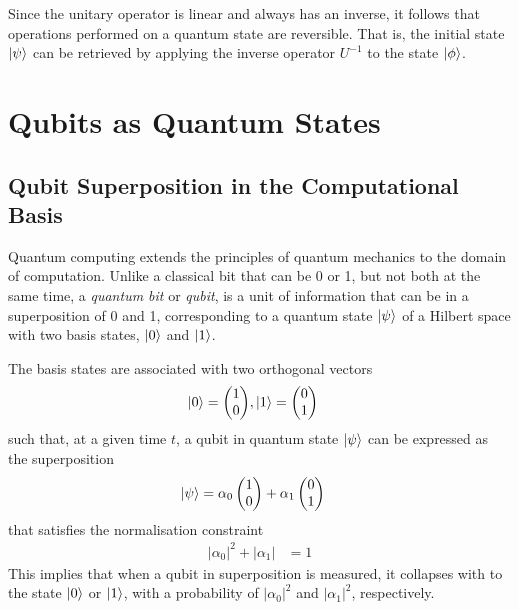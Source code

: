 Since the unitary operator is linear and always has an inverse, it follows that operations performed on a quantum state are reversible. That is, the initial state $\ket{\psi}$ can be retrieved by applying the inverse operator $U^{-1}$ to the state $\ket{\phi}$.  

\section{Qubits as Quantum States \label{sec:q-states-qubits}}

\subsection{Qubit Superposition in the Computational Basis}

Quantum computing extends the principles of quantum mechanics to the domain of computation. Unlike a classical bit that can be 0 or 1, but not both at the same time, a \textit{quantum bit} or \textit{qubit}, is a unit of information that can be in a superposition of 0 and 1, corresponding to a quantum state $\ket{\psi}$ of a Hilbert space with two basis states, $\ket{0}$ and $\ket{1}$. 

The basis states are associated with two orthogonal vectors
\begin{align}
	\ket{0} = \left(\begin{matrix}
		1\\
		0
	\end{matrix}\right) &, \ket{1} = \left(\begin{matrix}
	0\\
	1
\end{matrix}\right)
\end{align}
such that, at a given time $t$, a qubit in quantum state $\ket{\psi}$ can be expressed as the superposition
\begin{align}\label{eqn:qstate}
	\ket{\psi}	& = \alpha_0\left(\begin{matrix}
		1\\
		0
	\end{matrix}\right) + \alpha_1\left(\begin{matrix}
	0\\
	1
\end{matrix}\right)
\end{align}
that satisfies the normalisation constraint
\begin{align}
	|\alpha_0|^2 + |\alpha_1| & = 1
\end{align}
This implies that when a qubit in superposition is measured, it collapses with to the state $\ket{0}$ or $\ket{1}$, with a probability of $|\alpha_0|^2$ and $|\alpha_1|^2$, respectively.

